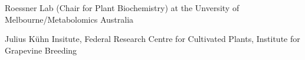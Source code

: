 {%
	}
{%
	Roessner Lab (Chair for Plant Biochemistry) at the Unversity of Melbourne/Metabolomics Australia
}
{%
}

{%
}
{%
	Julius K\"uhn Insitute, Federal Research Centre for Cultivated Plants, Institute for Grapevine Breeding
}
{%
}
